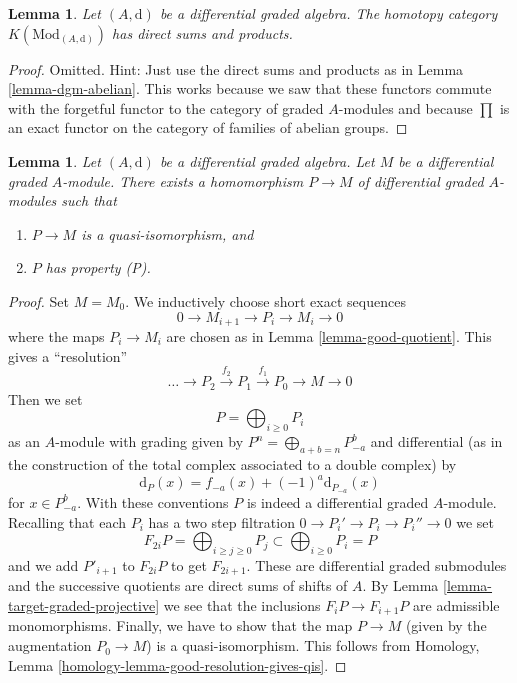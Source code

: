 \documentclass{stacks-project}
\theoremstyle{plain}
\newtheorem{lemma}[subsection]{Lemma}
\theoremstyle{definition}
\theoremstyle{remark}
\numberwithin{equation}{subsection}
\begin{document}
\begin{lemma}
\label{lemma-homotopy-direct-sums}
Let $(A, \text{d})$ be a differential graded algebra.
The homotopy category $K(\text{Mod}_{(A, \text{d})})$
has direct sums and products.
\end{lemma}

\begin{proof}
Omitted. Hint: Just use the direct sums and products as in
Lemma \ref{lemma-dgm-abelian}. This works because we saw that
these functors commute with the forgetful functor to the category
of graded $A$-modules and because $\prod$ is an exact functor
on the category of families of abelian groups.
\end{proof}

\begin{lemma}
\label{lemma-resolve}
Let $(A, \text{d})$ be a differential graded algebra.
Let $M$ be a differential graded $A$-module. There exists a homomorphism
$P \to M$ of differential graded $A$-modules such that
\begin{enumerate}
\item $P \to M$ is a quasi-isomorphism, and
\item $P$ has property (P).
\end{enumerate}
\end{lemma}

\begin{proof}
Set $M = M_0$. We inductively choose short exact sequences
$$
0 \to M_{i + 1} \to P_i \to M_i \to 0
$$
where the maps $P_i \to M_i$ are chosen as in Lemma \ref{lemma-good-quotient}.
This gives a ``resolution''
$$
\ldots \to P_2 \xrightarrow{f_2} P_1 \xrightarrow{f_1} P_0 \to M \to 0
$$
Then we set
$$
P = \bigoplus\nolimits_{i \geq 0} P_i
$$
as an $A$-module with grading given by
$P^n = \bigoplus_{a + b = n} P_{-a}^b$ and
differential (as in the construction of the total complex associated
to a double complex) by
$$
\text{d}_P(x) = f_{-a}(x) + (-1)^a \text{d}_{P_{-a}}(x)
$$
for $x \in P_{-a}^b$. With these conventions $P$ is indeed a differential
graded $A$-module. Recalling that each $P_i$ has a two step filtration
$0 \to P_i' \to P_i \to P_i'' \to 0$ we set
$$
F_{2i}P = \bigoplus\nolimits_{i \geq j \geq 0} P_j
\subset
\bigoplus\nolimits_{i \geq 0} P_i = P
$$
and we add $P'_{i + 1}$ to $F_{2i}P$ to get $F_{2i + 1}$.
These are differential graded submodules and the successive quotients
are direct sums of shifts of $A$. By
Lemma \ref{lemma-target-graded-projective} we see that
the inclusions $F_iP \to F_{i + 1}P$ are admissible monomorphisms.
Finally, we have to show that the map $P \to M$ (given by the
augmentation $P_0 \to M$) is a quasi-isomorphism. This follows from
Homology, Lemma \ref{homology-lemma-good-resolution-gives-qis}.
\end{proof}
\end{document}
